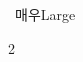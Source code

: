 

\begin{center}
    \ 매우Large %
\end{center}
\vspace{2em} %

\begin{multicols}{2}
\end{multicols}


